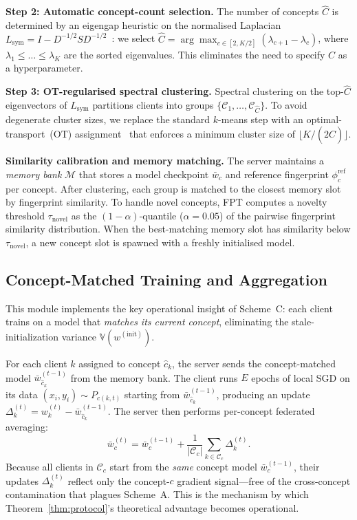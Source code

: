 \documentclass[11pt]{article}
\newcommand{\V}{\mathbb{V}}
\newcommand{\cC}{\mathcal{C}}
\newcommand{\wbar}{\bar{w}}
\begin{document}
\textbf{Step 2: Automatic concept-count selection.}
The number of concepts $\hat C$ is determined by an eigengap heuristic on the normalised Laplacian $L_{\mathrm{sym}} = I - D^{-1/2}SD^{-1/2}$~\citep{von2007tutorial}: we select $\hat C = \arg\max_{c \in [2, K/2]} (\lambda_{c+1} - \lambda_c)$, where $\lambda_1 \le \ldots \le \lambda_K$ are the sorted eigenvalues.
This eliminates the need to specify $C$ as a hyperparameter.

\textbf{Step 3: OT-regularised spectral clustering.}
Spectral clustering on the top-$\hat C$ eigenvectors of $L_{\mathrm{sym}}$ partitions clients into groups $\{\cC_1, \ldots, \cC_{\hat C}\}$.
To avoid degenerate cluster sizes, we replace the standard $k$-means step with an optimal-transport~(OT) assignment~\citep{villani2009optimal} that enforces a minimum cluster size of $\lfloor K / (2\hat C) \rfloor$.

\textbf{Similarity calibration and memory matching.}
The server maintains a \emph{memory bank} $\mathcal{M}$ that stores a model checkpoint $\wbar_c$ and reference fingerprint $\phi_c^{\mathrm{ref}}$ per concept.
After clustering, each group is matched to the closest memory slot by fingerprint similarity.
To handle novel concepts, FPT computes a novelty threshold $\tau_{\mathrm{novel}}$ as the $(1{-}\alpha)$-quantile ($\alpha = 0.05$) of the pairwise fingerprint similarity distribution.
When the best-matching memory slot has similarity below $\tau_{\mathrm{novel}}$, a new concept slot is spawned with a freshly initialised model.


\subsection{Concept-Matched Training and Aggregation}
\label{sec:matched_train}

This module implements the key operational insight of Scheme~C: each client trains on a model that \emph{matches its current concept}, eliminating the stale-initialization variance $\V(w^{(\mathrm{init})})$.

For each client $k$ assigned to concept $\hat c_k$, the server sends the concept-matched model $\wbar_{\hat c_k}^{(t-1)}$ from the memory bank.
The client runs $E$ epochs of local SGD on its data $(x_i, y_i) \sim P_{c(k,t)}$ starting from $\wbar_{\hat c_k}^{(t-1)}$, producing an update $\Delta_k^{(t)} = w_k^{(t)} - \wbar_{\hat c_k}^{(t-1)}$.
The server then performs per-concept federated averaging:
\begin{equation}
\wbar_c^{(t)} = \wbar_c^{(t-1)} + \frac{1}{|\cC_c|}\sum_{k \in \cC_c} \Delta_k^{(t)}.
\end{equation}
Because all clients in $\cC_c$ start from the \emph{same} concept model $\wbar_c^{(t-1)}$, their updates $\Delta_k^{(t)}$ reflect only the concept-$c$ gradient signal---free of the cross-concept contamination that plagues Scheme~A.
This is the mechanism by which Theorem~\ref{thm:protocol}'s theoretical advantage becomes operational.
\end{document}
